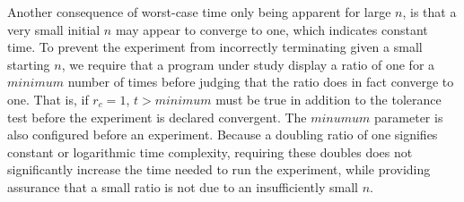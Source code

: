   Another consequence of worst-case time only being apparent for large $n$, is that a very small initial $n$ may appear
  to converge to one, which indicates constant time. To prevent the experiment from incorrectly terminating given a
  small starting $n$, we require that a program under study display a ratio of one for a $\mathit{minimum}$ number of
  times before judging that the ratio does in fact converge to one.  That is, if $r_c = 1$, $t > \mathit{minimum}$ must
  be true in addition to the tolerance test before the experiment is declared convergent.  The $\mathit{minumum}$
  parameter is also configured before an experiment.  Because a doubling ratio of one signifies constant or logarithmic
  time complexity, requiring these doubles does not significantly increase the time needed to run the experiment, while
  providing assurance that a small ratio is not due to an insufficiently small $n$.
